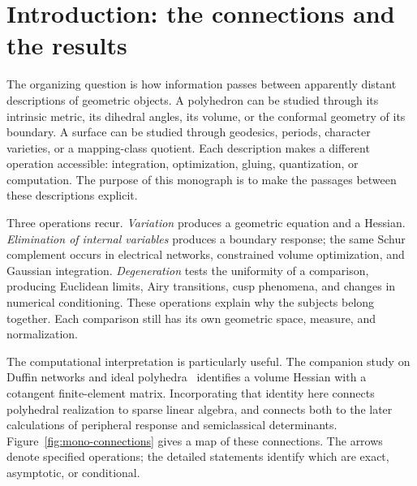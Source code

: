 \documentclass[11pt,a4paper]{article}
\numberwithin{equation}{section}
\theoremstyle{definition}
\theoremstyle{remark}
\begin{document}
\begin{abstract}
These results lead to a conjectural program: uniform quantum gluing and
Dehn filling, effective extraction of connected-curve coefficients,
weighted counting beyond the marked-torus model, and sharp norm-ball
discrepancies. Established inputs, deductions proved here, conditional
implications, and numerical evidence are distinguished throughout.
\end{abstract}

\clearpage
\setcounter{tocdepth}{2}
\begingroup\small
\linespread{0.98}\selectfont
\setlength{\parskip}{0pt}
\tableofcontents
\endgroup
\clearpage
\begingroup\small
\setlength{\parskip}{0pt}
\listoffigures
\endgroup
\clearpage
\section*{Introduction: the connections and the results}
\label{sec:monographintro}

The organizing question is how information passes between apparently
distant descriptions of geometric objects. A polyhedron can be studied
through its intrinsic metric, its dihedral angles, its volume, or the
conformal geometry of its boundary. A surface can be studied through
geodesics, periods, character varieties, or a mapping-class quotient.
Each description makes a different operation accessible: integration,
optimization, gluing, quantization, or computation. The purpose of this
monograph is to make the passages between these descriptions explicit.

Three operations recur. \emph{Variation} produces a geometric equation
and a Hessian. \emph{Elimination of internal variables} produces a boundary
response; the same Schur complement occurs in electrical networks,
constrained volume optimization, and Gaussian integration.
\emph{Degeneration} tests the uniformity of a comparison, producing
Euclidean limits, Airy transitions, cusp phenomena, and changes in
numerical conditioning. These operations explain why the subjects
belong together. Each comparison still has its own geometric space,
measure, and normalization.

The computational interpretation is particularly useful. The companion
study on Duffin networks and ideal polyhedra~\cite{IpolyStudy} identifies
a volume Hessian with a cotangent finite-element matrix. Incorporating
that identity here connects polyhedral realization to sparse linear
algebra, and connects both to the later calculations of peripheral
response and semiclassical determinants. Figure~\ref{fig:mono-connections}
gives a map of these connections. The arrows denote specified operations;
the detailed statements identify which are exact, asymptotic, or conditional.
\end{document}
